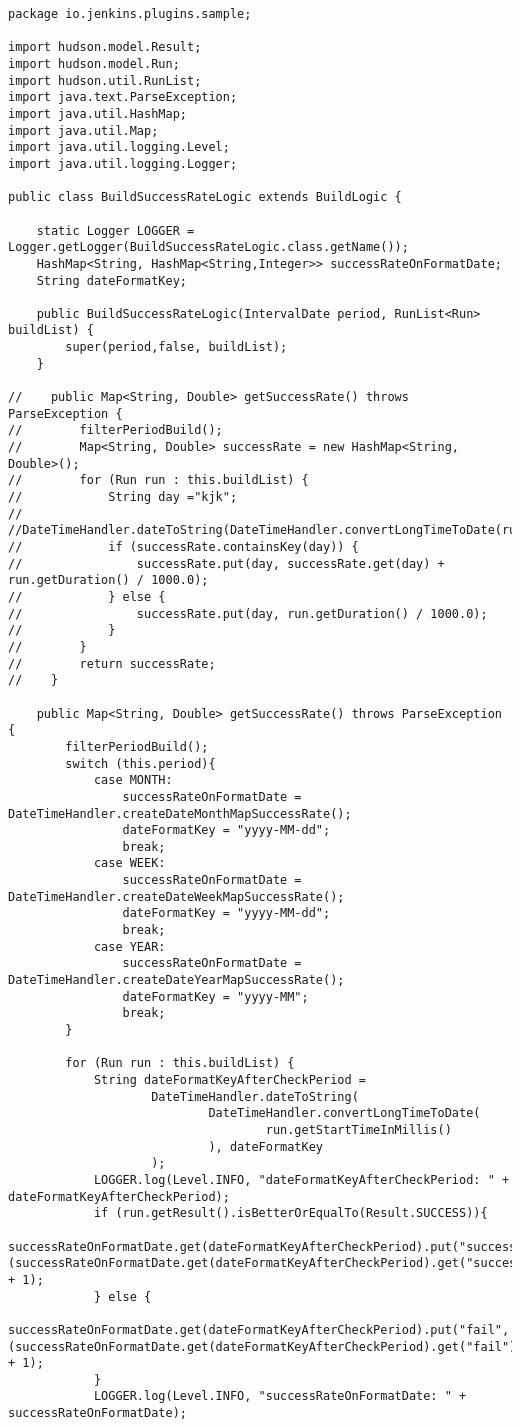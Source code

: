 \begin{lstlisting}
package io.jenkins.plugins.sample;

import hudson.model.Result;
import hudson.model.Run;
import hudson.util.RunList;
import java.text.ParseException;
import java.util.HashMap;
import java.util.Map;
import java.util.logging.Level;
import java.util.logging.Logger;

public class BuildSuccessRateLogic extends BuildLogic {

    static Logger LOGGER = Logger.getLogger(BuildSuccessRateLogic.class.getName());
    HashMap<String, HashMap<String,Integer>> successRateOnFormatDate;
    String dateFormatKey;

    public BuildSuccessRateLogic(IntervalDate period, RunList<Run> buildList) {
        super(period,false, buildList);
    }

//    public Map<String, Double> getSuccessRate() throws ParseException {
//        filterPeriodBuild();
//        Map<String, Double> successRate = new HashMap<String, Double>();
//        for (Run run : this.buildList) {
//            String day ="kjk";
//                    //DateTimeHandler.dateToString(DateTimeHandler.convertLongTimeToDate(run.getStartTimeInMillis()));
//            if (successRate.containsKey(day)) {
//                successRate.put(day, successRate.get(day) + run.getDuration() / 1000.0);
//            } else {
//                successRate.put(day, run.getDuration() / 1000.0);
//            }
//        }
//        return successRate;
//    }

    public Map<String, Double> getSuccessRate() throws ParseException {
        filterPeriodBuild();
        switch (this.period){
            case MONTH:
                successRateOnFormatDate = DateTimeHandler.createDateMonthMapSuccessRate();
                dateFormatKey = "yyyy-MM-dd";
                break;
            case WEEK:
                successRateOnFormatDate = DateTimeHandler.createDateWeekMapSuccessRate();
                dateFormatKey = "yyyy-MM-dd";
                break;
            case YEAR:
                successRateOnFormatDate = DateTimeHandler.createDateYearMapSuccessRate();
                dateFormatKey = "yyyy-MM";
                break;
        }

        for (Run run : this.buildList) {
            String dateFormatKeyAfterCheckPeriod =
                    DateTimeHandler.dateToString(
                            DateTimeHandler.convertLongTimeToDate(
                                    run.getStartTimeInMillis()
                            ), dateFormatKey
                    );
            LOGGER.log(Level.INFO, "dateFormatKeyAfterCheckPeriod: " + dateFormatKeyAfterCheckPeriod);
            if (run.getResult().isBetterOrEqualTo(Result.SUCCESS)){
                successRateOnFormatDate.get(dateFormatKeyAfterCheckPeriod).put("success", (successRateOnFormatDate.get(dateFormatKeyAfterCheckPeriod).get("success")) + 1);
            } else {
                successRateOnFormatDate.get(dateFormatKeyAfterCheckPeriod).put("fail", (successRateOnFormatDate.get(dateFormatKeyAfterCheckPeriod).get("fail")) + 1);
            }
            LOGGER.log(Level.INFO, "successRateOnFormatDate: " + successRateOnFormatDate);


\end{lstlisting}
